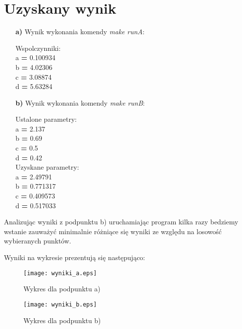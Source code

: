 \documentclass{article}
\begin{document}
  \section{Uzyskany wynik}
  \begin{enumerate}
    \item[\bf{a)}] Wynik wykonania komendy \textit{make runA}:
    \begin{center}
      \begin{tcolorbox}
        Wspolczynniki: \\ 
        a \textbf{=} 0.100934 \\
        b \textbf{=} 4.02306 \\
        c \textbf{=} 3.08874 \\
        d \textbf{=} 5.63284 \\
      \end{tcolorbox}
    \end{center}

    \item[\bf{b)}] Wynik wykonania komendy \textit{make runB}:
    \begin{center}
      \begin{tcolorbox}
        Ustalone parametry: \\
        a \textbf{=} 2.137 \\
        b \textbf{=} 0.69 \\ 
        c \textbf{=} 0.5 \\
        d \textbf{=} 0.42 \\
        Uzyskane parametry: \\ 
        a \textbf{=} 2.49791 \\ 
        b \textbf{=} 0.771317 \\ 
        c \textbf{=} 0.409573 \\
        d \textbf{=} 0.517033 \\
      \end{tcolorbox}
    \end{center}
  \end{enumerate}

  Analizując wyniki z  podpunktu b) uruchamiając program kilka razy bedziemy wstanie zauważyć minimalnie różniące się wyniki ze względu na losowość wybieranych punktów.

  Wyniki na wykresie prezentują się następująco:
    \begin{figure}[!ht]
      \begin{minipage}{0.5\textwidth}
        \centering
        \texttt{[image: wyniki\_a.eps]}
        \caption{Wykres dla podpunktu a)}
      \end{minipage}
      \begin{minipage}{0.5\textwidth}
        \centering
        \texttt{[image: wyniki\_b.eps]}
        \caption{Wykres dla podpunktu b)}
      \end{minipage}
    \end{figure}
\end{document}
